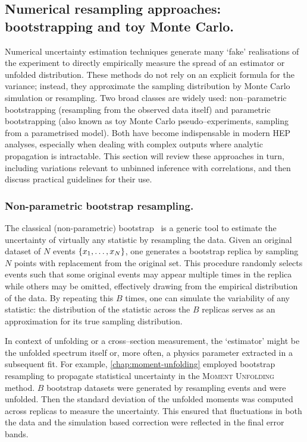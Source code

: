     \subsection{Numerical resampling approaches: bootstrapping and toy Monte Carlo.}
        Numerical uncertainty estimation techniques generate many `fake' realisations of the experiment to directly empirically measure the spread of an estimator or unfolded distribution.
        These methods do not rely on an explicit formula for the variance; instead, they approximate the sampling distribution by Monte Carlo simulation or resampling. 
        Two broad classes are widely used: non--parametric bootstrapping (resampling from the observed data itself) and parametric bootstrapping (also known as toy Monte Carlo pseudo--experiments, sampling from a parametrised model).
        Both have become indispensable in modern HEP analyses, especially when dealing with complex outputs where analytic propagation is intractable.
        This section will review these approaches in turn, including variations relevant to unbinned inference with correlations, and then discuss practical guidelines for their use.
        \subsubsection{Non-parametric bootstrap resampling.}
            The classical (non-parametric) bootstrap~\cite{zivot_86_2025} is a generic tool to estimate the uncertainty of virtually any statistic by resampling the data.
            Given an original dataset of $N$ events $\qty{x_1,\dots,x_N}$, one generates a bootstrap replica by sampling $N$ points with replacement from the original set.
            This procedure randomly selects events such that some original events may appear multiple times in the replica while others may be omitted, effectively drawing from the empirical distribution of the data.
            By repeating this $B$ times, one can simulate the variability of any statistic: the distribution of the statistic across the $B$ replicas serves as an approximation for its true sampling distribution.
            
            In context of unfolding or a cross--section measurement, the `estimator' might be the unfolded spectrum itself or, more often, a physics parameter extracted in a subsequent fit.
            For example, \cref{chap:moment-unfolding} employed bootstrap resampling to propagate statistical uncertainty in the \textsc{Moment Unfolding} method.
            $B$ bootstrap datasets were generated by resampling events and were unfolded.
            Then the standard deviation of the unfolded moments was computed across replicas to measure the uncertainty.
            This ensured that fluctuations in both the data and the simulation based correction were reflected in the final error bands.

